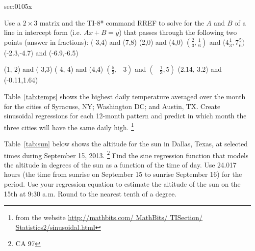 \begin{multicols*}{2}
\begin{exercises}{sec:0105x}
\prob[0105LM1]
Use a $2 \times 3$ matrix and the TI-8* command RREF to solve for the
$A$ and $B$ of a line in intercept form (i.e. $Ax+B=y$) that passes
through the following two points (answer in fractions):
\subprob (-3,4) and (7,8)
\subprob (2,0) and (4,0)
\subprob $(\frac{2}{3},\frac{1}{6})$ and ($4\frac{1}{3},7\frac{5}{6})$
\subprob (-2.3,-4.7) and (-6.9,-6.5)

\prob[0105LM2]
\subprob (1,-2) and (-3,3)
\subprob (-4,-4) and (4,4)
\subprob $(\frac{5}{3},-3)$ and $(-\frac{1}{3},5)$
\subprob (2.14,-3.2) and (-0.11,1.64)


\prob[0105high] Table~\ref{tab:temps} shows the highest daily temperature  
averaged over the month for the cities of 
Syracuse, NY; Washington DC; and Austin, TX.  Create sinusoidal regressions for each 12-month 
pattern and predict in which month the three cities will have the same daily high. 
\footnote{from the website \url{http://mathbits.com/ MathBits/ TISection/ Statistics2/sinusoidal.html}}



\prob[0105sun] Table~\ref{tab:sun} below shows the altitude for the
sun in Dallas, Texas, at selected times during September 15, 2013. \footnote{CA 97}
\subprob Find the sine regression function that models 
the altitude in degrees of the sun as a function of the
time of day.  Use 24.017 hours (the time from sunrise
on September 15 to sunrise September 16) for the period.
\subprob Use your regression equation to estimate the altitude
of the sun on the 15th at 9:30 a.m.  Round to the nearest
tenth of a degree.



\end{exercises}
\end{multicols*}

